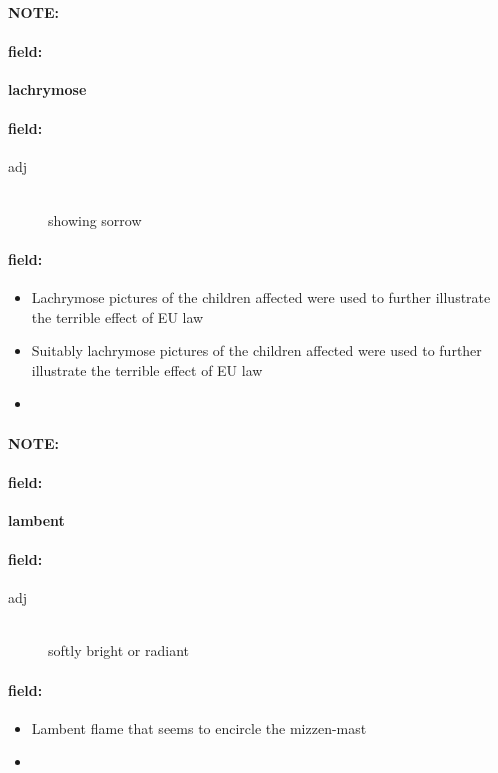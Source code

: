 \documentclass[12pt]{article}
\newenvironment{note}{\paragraph{NOTE:}}{}
\newenvironment{field}{\paragraph{field:}}{}
\begin{document}
\begin{note}
\begin{field}
\textbf{\large lachrymose}
\end{field}


\begin{field}
\begin{description}
\item[adj] \hfill \\ 
showing sorrow

\end{description}
\end{field}

\begin{field}
\begin{itemize}
\item Lachrymose pictures of the children affected were used to further illustrate the terrible effect of EU law
\item Suitably lachrymose pictures of the children affected were used to further illustrate the terrible effect of EU law
\item 
\end{itemize}
\end{field}
\end{note}
\begin{note}
\begin{field}
\textbf{\large lambent}
\end{field}


\begin{field}
\begin{description}
\item[adj] \hfill \\ 
softly bright or radiant

\end{description}
\end{field}

\begin{field}
\begin{itemize}
\item Lambent flame that seems to encircle the mizzen-mast
\item 
\end{itemize}
\end{field}
\end{note}
\end{document}
